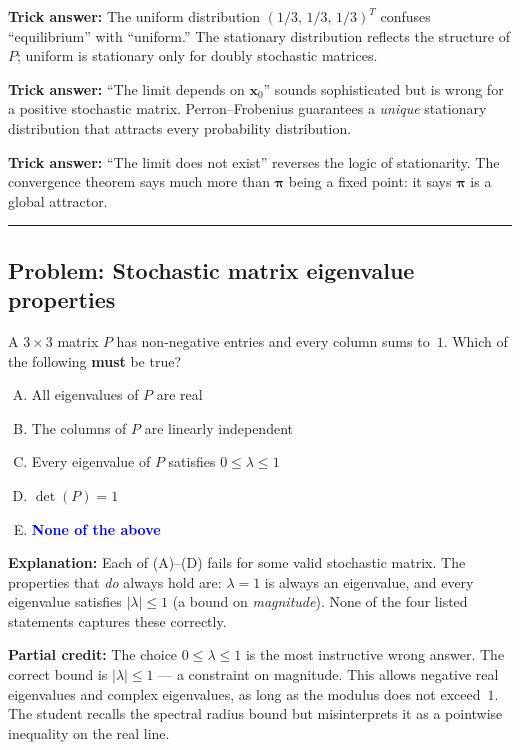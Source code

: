 \documentclass[12pt]{amsart}
\newcommand{\divider}{
  \vspace{-1em}
  \noindent
  \raisebox{-0.15ex}{\textbullet}%
  \hspace{0.5em}%
  \rule[0.5ex]{0.95\textwidth}{1.0pt}%
  \hspace{0.5em}%
  \raisebox{-0.15ex}{\textbullet}%
  \vspace{0em}
}
\begin{document}
\textbf{Trick answer:}
The uniform distribution $(1/3,\, 1/3,\, 1/3)^T$ confuses ``equilibrium''
with ``uniform.'' The stationary distribution reflects the structure of
$P$; uniform is stationary only for doubly stochastic matrices.

\textbf{Trick answer:}
``The limit depends on $\mathbf{x}_0$'' sounds sophisticated but is wrong
for a positive stochastic matrix. Perron--Frobenius guarantees a
\emph{unique} stationary distribution that attracts every probability
distribution.

\textbf{Trick answer:}
``The limit does not exist'' reverses the logic of stationarity. The
convergence theorem says much more than $\boldsymbol{\pi}$ being a fixed
point: it says $\boldsymbol{\pi}$ is a global attractor.

\divider

\subsection*{Problem: Stochastic matrix eigenvalue properties}

A $3 \times 3$ matrix $P$ has non-negative entries and every column
sums to~$1$.
Which of the following \textbf{must} be true?

\begin{enumerate}[(A)]
\item All eigenvalues of $P$ are real
\item The columns of $P$ are linearly independent
\item Every eigenvalue of $P$ satisfies $0 \leq \lambda \leq 1$
\item $\det(P) = 1$
\item \textcolor{blue}{\textbf{None of the above}}
\end{enumerate}

\textbf{Explanation:}
Each of (A)--(D) fails for some valid stochastic matrix. The properties
that \emph{do} always hold are: $\lambda = 1$ is always an eigenvalue,
and every eigenvalue satisfies $|\lambda| \leq 1$ (a bound on
\emph{magnitude}). None of the four listed statements captures these
correctly.

\textbf{Partial credit:}
The choice $0 \leq \lambda \leq 1$ is the most instructive wrong answer.
The correct bound is $|\lambda| \leq 1$ --- a constraint on magnitude.
This allows negative real eigenvalues and complex eigenvalues, as long as
the modulus does not exceed~$1$. The student recalls the spectral radius
bound but misinterprets it as a pointwise inequality on the real line.
\end{document}
